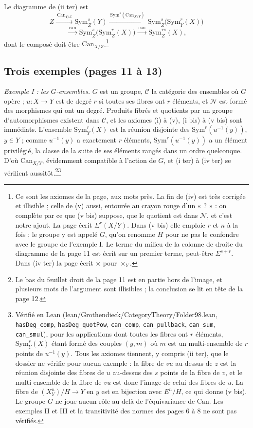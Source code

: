 \documentclass[11pt,a4paper]{article}
\begin{document}
Le diagramme de (ii ter) est
\[
  Z \xrightarrow{\ \mathrm{Can}_{Y/Z}\ } \mathrm{Sym}^{s}_{Z}(Y)
  \xrightarrow{\ \mathrm{Sym}^{s}(\mathrm{Can}_{X/Y})\ }
  \mathrm{Sym}^{s}_{Z}\bigl(\mathrm{Sym}^{r}_{Y}(X)\bigr)
\]
\[
  \xrightarrow{\ \mathrm{can}\ }
  \mathrm{Sym}^{s}_{Z}\bigl(\mathrm{Sym}^{r}_{Z}(X)\bigr)
  \xrightarrow{\ \mathrm{can}\ } \mathrm{Sym}^{rs}_{Z}(X),
\]
dont le composé doit être $\mathrm{Can}_{X/Z}$.\footnote{Ce sont les
axiomes de la page, aux mots près. La fin de (iv) est très corrigée et
illisible ; celle de (v) aussi, entourée au crayon rouge d'un « ? » : on
complète par ce que (v bis) suppose, que le quotient est dans $\mathcal{N}$,
et c'est notre ajout. La page écrit $\Sigma^{r}(X/Y)$. Dans (v bis) elle
emploie $r$ et $n$ à la fois ; le groupe y est appelé $G$, qu'on renomme $H$
pour ne pas le confondre avec le groupe de l'exemple I. Le terme du milieu
de la colonne de droite du diagramme de la page 11 est écrit sur un premier
terme, peut-être $\Sigma^{s+r}$. Dans (iv ter) la page écrit $\times$ pour
$\times_Y$.}

\subsection*{Trois exemples (pages 11 à 13)}

\emph{Exemple I : les $G$-ensembles.} $G$ est un groupe, $\mathcal{C}$ la
catégorie des ensembles où $G$ opère ; $u : X \to Y$ est de degré $r$ si
toutes ses fibres ont $r$ éléments, et $\mathcal{N}$ est formé des
morphismes qui ont un degré. Produits fibrés et quotients par un groupe
d'automorphismes existent dans $\mathcal{C}$, et les axiomes (i) à (v),
(i bis) à (v bis) sont immédiats. L'ensemble $\mathrm{Sym}^{r}_{Y}(X)$ est
la réunion disjointe des $\mathrm{Sym}^{r}(u^{-1}(y))$, $y \in Y$ ; comme
$u^{-1}(y)$ a exactement $r$ éléments, $\mathrm{Sym}^{r}(u^{-1}(y))$ a un
élément privilégié, la classe de la suite de ses éléments rangés dans un
ordre quelconque. D'où $\mathrm{Can}_{X/Y}$, évidemment compatible à
l'action de $G$, et (i ter) à (iv ter) se vérifient aussitôt.\footnote{Le
bas du feuillet droit de la page 11 est en partie hors de l'image, et
plusieurs mots de l'argument sont illisibles ; la conclusion se lit en tête
de la page 12.}\footnote{Vérifié en Lean (lean/Grothendieck/CategoryTheory/Folder98.lean,
\texttt{hasDeg\_comp}, \texttt{hasDeg\_quotPow}, \texttt{can\_comp},
\texttt{can\_pullback}, \texttt{can\_sum}, \texttt{can\_smul}), pour les
applications dont toutes les fibres ont $r$ éléments, $\mathrm{Sym}^{r}_{Y}(X)$
étant formé des couples $(y, m)$ où $m$ est un multi-ensemble de $r$ points de
$u^{-1}(y)$. Tous les axiomes tiennent, y compris (ii ter), que le dossier ne
vérifie pour aucun exemple : la fibre de $vu$ au-dessus de $z$ est la réunion
disjointe des fibres de $u$ au-dessus des $s$ points de la fibre de $v$, et le
multi-ensemble de la fibre de $vu$ est donc l'image de celui des fibres de $u$.
La fibre de $(X^{n}_{Y})/H \to Y$ en $y$ est en bijection avec $E^{n}/H$, ce
qui donne (v bis). Le groupe $G$ ne joue aucun rôle au-delà de l'équivariance de
$\mathrm{Can}$. Les exemples II et III et la transitivité des normes des
pages 6 à 8 ne sont pas vérifiés.}
\end{document}
